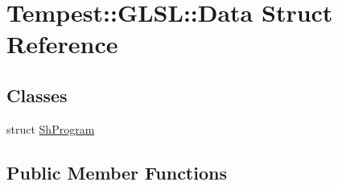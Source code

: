 \hypertarget{struct_g_l_s_l_1_1_data}{\section{Tempest\+:\+:G\+L\+S\+L\+:\+:Data Struct Reference}
\label{struct_g_l_s_l_1_1_data}
}
\subsection*{Classes}
\begin{DoxyCompactItemize}
\item 
struct \hyperlink{struct_g_l_s_l_1_1_data_1_1_sh_program}{Sh\+Program}
\end{DoxyCompactItemize}
\subsection*{Public Member Functions}
